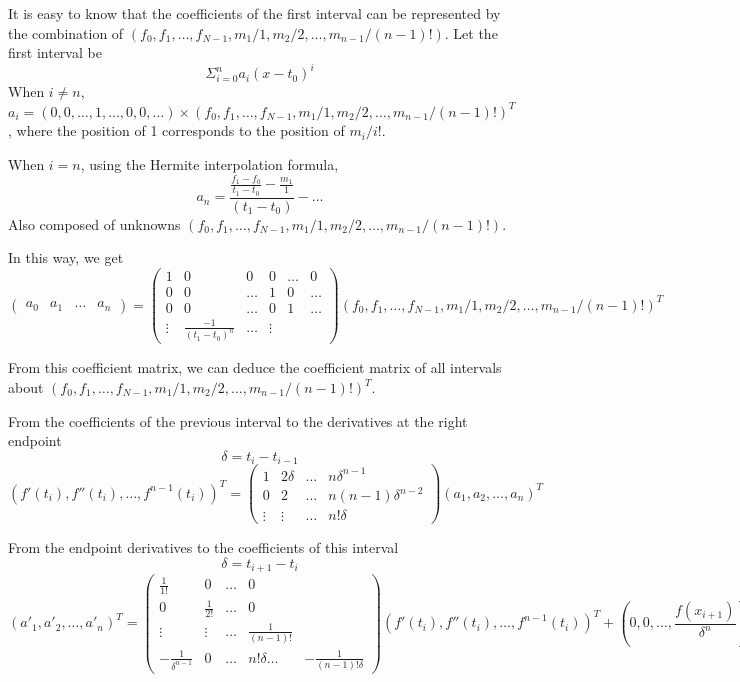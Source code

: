 \documentclass[a4paper]{article}
\begin{document}
It is easy to know that the coefficients of the first interval can be represented by the combination of \((f_0, f_1, \dots, f_{N-1}, m_1/1, m_2/2, \dots, m_{n-1}/(n-1)!)\). Let the first interval be
\[
\Sigma_{i=0}^{n} a_i (x - t_0)^i
\]
When \(i \neq n\), \(a_i = (0, 0, \dots, 1, \dots, 0, 0, \dots) \times (f_0, f_1, \dots, f_{N-1}, m_1/1, m_2/2, \dots, m_{n-1}/(n-1)!)^T\), where the position of 1 corresponds to the position of \(m_i/i!\).

When \(i = n\), using the Hermite interpolation formula,
\[
a_n = \frac{\frac{f_1 - f_0}{t_1 - t_0} - \frac{m_1}{1}}{(t_1 - t_0)} - \dots
\]
Also composed of unknowns \((f_0, f_1, \dots, f_{N-1}, m_1/1, m_2/2, \dots, m_{n-1}/(n-1)!)\).

In this way, we get
\[
\begin{pmatrix}
a_0 & a_1 & \dots & a_n
\end{pmatrix}
=
\begin{pmatrix}
1 & 0 & 0 & 0 & \dots & 0 \\
0 & 0 & \dots & 1 & 0 & \dots \\
0 & 0 & \dots & 0 & 1 & \dots \\
\vdots & \frac{-1}{(t_1 - t_0)^n} & \dots & \vdots
\end{pmatrix}
(f_0, f_1, \dots, f_{N-1}, m_1/1, m_2/2, \dots, m_{n-1}/(n-1)!)^T
\]

From this coefficient matrix, we can deduce the coefficient matrix of all intervals about \((f_0, f_1, \dots, f_{N-1}, m_1/1, m_2/2, \dots, m_{n-1}/(n-1)!)^T\).

From the coefficients of the previous interval to the derivatives at the right
endpoint
\[
\delta = t_i - t_{i-1}
\]
\[
(f'(t_i), f''(t_i), \dots, f^{n-1}(t_i))^T
=
\begin{pmatrix}
1 & 2\delta & \dots & n\delta^{n-1} \\
0 & 2 & \dots & n(n-1)\delta^{n-2} \\
\vdots & \vdots & \dots & n! \delta
\end{pmatrix}
(a_1, a_2, \dots, a_n)^T
\]

From the endpoint derivatives to the coefficients of this interval
\[
\delta = t_{i+1} - t_{i}
\]
\[
(a'_1, a'_2, \dots, a'_n)^T
=
\begin{pmatrix}
\frac{1}{1!} & 0 & \dots & 0 \\
0 & \frac{1}{2!} & \dots & 0 \\
\vdots & \vdots & \dots & \frac{1}{(n-1)!} \\
-\frac{1}{\delta^{n-1}} & 0 & \dots & n! \delta \dots & -\frac{1}{(n-1)! \delta}
\end{pmatrix}
(f'(t_i), f''(t_i), \dots, f^{n-1}(t_i))^T
+ (0, 0, \dots, \frac{f(x_{i+1})}{\delta^n})^T
\]
\end{document}

